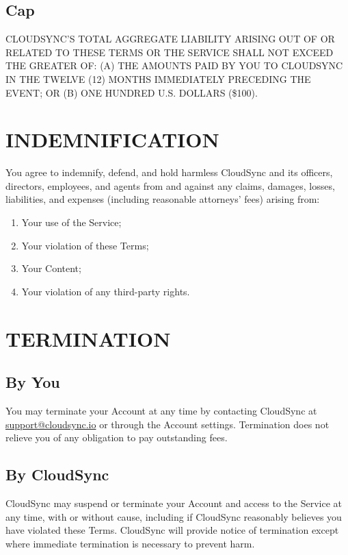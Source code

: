 \documentclass[
    language=english,
    doctype=terms-of-service,
    institution=none,
]{../../omnilatex}
\begin{document}
\subsection{Cap}
CLOUDSYNC'S TOTAL AGGREGATE LIABILITY ARISING OUT OF OR RELATED TO THESE TERMS OR THE SERVICE SHALL NOT EXCEED THE GREATER OF: (A) THE AMOUNTS PAID BY YOU TO CLOUDSYNC IN THE TWELVE (12) MONTHS IMMEDIATELY PRECEDING THE EVENT; OR (B) ONE HUNDRED U.S. DOLLARS (\$100).

\section{INDEMNIFICATION}

You agree to indemnify, defend, and hold harmless CloudSync and its officers, directors, employees, and agents from and against any claims, damages, losses, liabilities, and expenses (including reasonable attorneys' fees) arising from:
\begin{enumerate}
    \item Your use of the Service;
    \item Your violation of these Terms;
    \item Your Content;
    \item Your violation of any third-party rights.
\end{enumerate}

\section{TERMINATION}

\subsection{By You}
You may terminate your Account at any time by contacting CloudSync at \url{support@cloudsync.io} or through the Account settings. Termination does not relieve you of any obligation to pay outstanding fees.

\subsection{By CloudSync}
CloudSync may suspend or terminate your Account and access to the Service at any time, with or without cause, including if CloudSync reasonably believes you have violated these Terms. CloudSync will provide notice of termination except where immediate termination is necessary to prevent harm.
\end{document}

